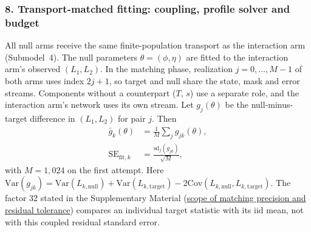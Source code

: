 \subsubsection*{8. Transport-matched fitting: coupling, profile solver and budget}
All null arms receive the same finite-population transport as the interaction arm (Submodel~4). The null parameters $\theta=(\phi,\eta)$ are fitted to the interaction arm's observed $(L_1,L_2)$. In the matching phase, realization $j=0,\ldots,M-1$ of both arms uses index $2j+1$, so target and null share the state, mask and error streams. Components without a counterpart ($T$, $s$) use a separate  role, and the interaction arm's network uses its own stream. Let $g_j(\theta)$ be the null-minus-target difference in $(L_1,L_2)$ for pair $j$. Then
\begin{align*}
\bar g_k(\theta)&=\frac1M\sum_j g_{jk}(\theta),\\
\mathrm{SE}_{\mathrm{fit},k}&=\frac{\mathrm{sd}_j(g_{jk})}{\sqrt M},
\end{align*}
with $M=1{,}024$ on the first attempt.
Here $\mathrm{Var}(g_{jk})=\mathrm{Var}(L_{k,\mathrm{null}})+\mathrm{Var}(L_{k,\mathrm{target}})-2\mathrm{Cov}(L_{k,\mathrm{null}},L_{k,\mathrm{target}})$. The factor 32 stated in the Supplementary Material (\hyperref[supp:matching-scope]{scope of matching precision and residual tolerance}) compares an individual target statistic with its iid mean, not with this coupled residual standard error. %

